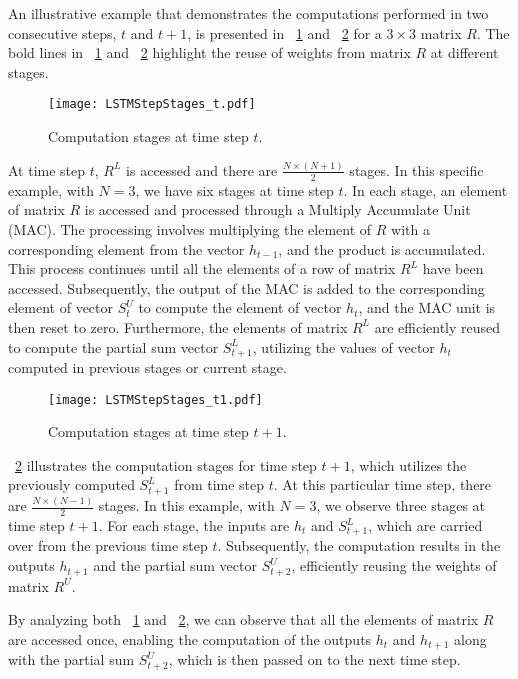 An illustrative example that demonstrates the computations performed in two consecutive steps, $t$ and $t{+}1$, is presented in \figurename{~\ref{fig:ExampleComputation_t}} and \figurename{~\ref{fig:ExampleComputation_t+1}} for a $3{\times}3$ matrix $R$. The bold lines in \figurename{~\ref{fig:ExampleComputation_t}} and \figurename{~\ref{fig:ExampleComputation_t+1}} highlight the reuse of weights from matrix $R$ at different stages.
\begin{figure}[htbp]
	\centerline{\texttt{[image: LSTMStepStages\_t.pdf]}}
	\caption{Computation stages at time step $t$.}
	\label{fig:ExampleComputation_t}
\end{figure}

At time step $t$, $R^L$ is accessed and there are $\frac{N{\times}(N{+}1)}{2}$ stages. In this specific example, with $N=3$, we have six stages at time step $t$. In each stage, an element of matrix $R$ is accessed and processed through a Multiply Accumulate Unit (MAC). The processing involves multiplying the element of $R$ with a corresponding element from the vector $h_{t{-}1}$, and the product is accumulated. This process continues until all the elements of a row of matrix $R^L$ have been accessed. Subsequently, the output of the MAC is added to the corresponding element of vector $S^U_{t}$ to compute the element of vector $h_t$, and the MAC unit is then reset to zero. Furthermore, the elements of matrix $R^L$ are efficiently reused to compute the partial sum vector $S^L_{t{+}1}$, utilizing the values of vector $h_{t}$ computed in previous stages or current stage.
\begin{figure}[htbp]
	\centerline{\texttt{[image: LSTMStepStages\_t1.pdf]}}
	\caption{Computation stages at time step $t{+}1$.}
	\label{fig:ExampleComputation_t+1}
\end{figure}

\figurename{~\ref{fig:ExampleComputation_t+1}} illustrates the computation stages for time step $t{+}1$, which utilizes the previously computed $S^L_{t{+}1}$ from time step $t$. At this particular time step, there are $\frac{N{\times}(N{-}1)}{2}$ stages. In this example, with $N=3$, we observe three stages at time step $t{+}1$. For each stage, the inputs are $h_t$ and $S^L_{t{+}1}$, which are carried over from the previous time step $t$. Subsequently, the computation results in the outputs $h_{t{+}1}$ and the partial sum vector $S^U_{t{+}2}$, efficiently reusing the weights of matrix $R^U$.

By analyzing both \figurename{~\ref{fig:ExampleComputation_t}} and \figurename{~\ref{fig:ExampleComputation_t+1}}, we can observe that all the elements of matrix $R$ are accessed once, enabling the computation of the outputs $h_t$ and $h_{t{+}1}$ along with the partial sum $S^U_{t{+}2}$, which is then passed on to the next time step.

